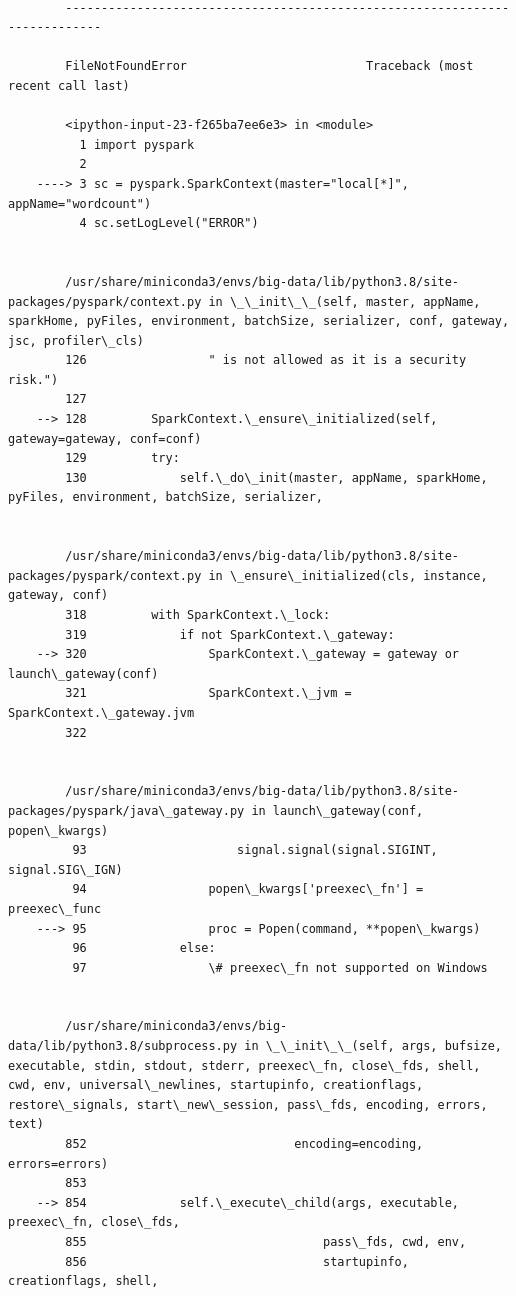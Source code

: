 \documentclass[11pt]{article}
\begin{document}
    \begin{Verbatim}[commandchars=\\\{\}]

        ---------------------------------------------------------------------------

        FileNotFoundError                         Traceback (most recent call last)

        <ipython-input-23-f265ba7ee6e3> in <module>
          1 import pyspark
          2 
    ----> 3 sc = pyspark.SparkContext(master="local[*]", appName="wordcount")
          4 sc.setLogLevel("ERROR")


        /usr/share/miniconda3/envs/big-data/lib/python3.8/site-packages/pyspark/context.py in \_\_init\_\_(self, master, appName, sparkHome, pyFiles, environment, batchSize, serializer, conf, gateway, jsc, profiler\_cls)
        126                 " is not allowed as it is a security risk.")
        127 
    --> 128         SparkContext.\_ensure\_initialized(self, gateway=gateway, conf=conf)
        129         try:
        130             self.\_do\_init(master, appName, sparkHome, pyFiles, environment, batchSize, serializer,


        /usr/share/miniconda3/envs/big-data/lib/python3.8/site-packages/pyspark/context.py in \_ensure\_initialized(cls, instance, gateway, conf)
        318         with SparkContext.\_lock:
        319             if not SparkContext.\_gateway:
    --> 320                 SparkContext.\_gateway = gateway or launch\_gateway(conf)
        321                 SparkContext.\_jvm = SparkContext.\_gateway.jvm
        322 


        /usr/share/miniconda3/envs/big-data/lib/python3.8/site-packages/pyspark/java\_gateway.py in launch\_gateway(conf, popen\_kwargs)
         93                     signal.signal(signal.SIGINT, signal.SIG\_IGN)
         94                 popen\_kwargs['preexec\_fn'] = preexec\_func
    ---> 95                 proc = Popen(command, **popen\_kwargs)
         96             else:
         97                 \# preexec\_fn not supported on Windows


        /usr/share/miniconda3/envs/big-data/lib/python3.8/subprocess.py in \_\_init\_\_(self, args, bufsize, executable, stdin, stdout, stderr, preexec\_fn, close\_fds, shell, cwd, env, universal\_newlines, startupinfo, creationflags, restore\_signals, start\_new\_session, pass\_fds, encoding, errors, text)
        852                             encoding=encoding, errors=errors)
        853 
    --> 854             self.\_execute\_child(args, executable, preexec\_fn, close\_fds,
        855                                 pass\_fds, cwd, env,
        856                                 startupinfo, creationflags, shell,



\end{Verbatim}
\end{document}
